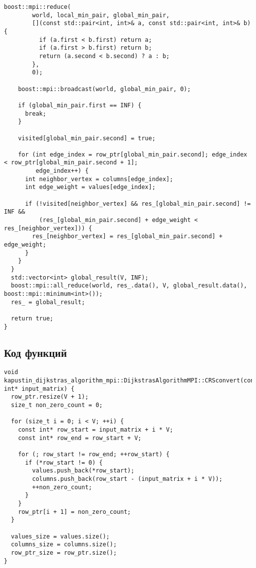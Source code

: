 \documentclass[a4paper,14pt]{extarticle}
\begin{document}
\begin{lstlisting}[caption={Функция run параллельного алгоритма}]
    boost::mpi::reduce(
        world, local_min_pair, global_min_pair,
        [](const std::pair<int, int>& a, const std::pair<int, int>& b) {
          if (a.first < b.first) return a;
          if (a.first > b.first) return b;
          return (a.second < b.second) ? a : b;
        },
        0);

    boost::mpi::broadcast(world, global_min_pair, 0);

    if (global_min_pair.first == INF) {
      break;
    }

    visited[global_min_pair.second] = true;

    for (int edge_index = row_ptr[global_min_pair.second]; edge_index < row_ptr[global_min_pair.second + 1];
         edge_index++) {
      int neighbor_vertex = columns[edge_index];
      int edge_weight = values[edge_index];

      if (!visited[neighbor_vertex] && res_[global_min_pair.second] != INF &&
          (res_[global_min_pair.second] + edge_weight < res_[neighbor_vertex])) {
        res_[neighbor_vertex] = res_[global_min_pair.second] + edge_weight;
      }
    }
  }
  std::vector<int> global_result(V, INF);
  boost::mpi::all_reduce(world, res_.data(), V, global_result.data(), boost::mpi::minimum<int>());
  res_ = global_result;

  return true;
}
\end{lstlisting}
\clearpage
\subsection{Код функций}

\begin{lstlisting}[caption={Функция CRSconvert для преобразования матрицы в формат CRS. MPI версия.}]
void kapustin_dijkstras_algorithm_mpi::DijkstrasAlgorithmMPI::CRSconvert(const int* input_matrix) {
  row_ptr.resize(V + 1);
  size_t non_zero_count = 0;

  for (size_t i = 0; i < V; ++i) {
    const int* row_start = input_matrix + i * V;
    const int* row_end = row_start + V;

    for (; row_start != row_end; ++row_start) {
      if (*row_start != 0) {
        values.push_back(*row_start);
        columns.push_back(row_start - (input_matrix + i * V));
        ++non_zero_count;
      }
    }
    row_ptr[i + 1] = non_zero_count;
  }

  values_size = values.size();
  columns_size = columns.size();
  row_ptr_size = row_ptr.size();
}
\end{lstlisting}
\clearpage
\end{document}
